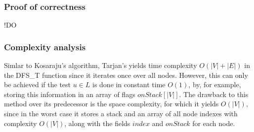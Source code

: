 \subsubsection{Proof of correctness}
!DO
\subsubsection{Complexity analysis}
Simlar to Kosaraju's algorithm, Tarjan's yields time complexity $O(|V|+|E|)$ in the DFS\_T function since it iterates once over all nodes. However, this can only be achieved if the test $u \in L$ is done in constant time $O(1)$, by, for example, storing this information in an array of flags $onStack[|V|]$.
The drawback to this method over its predecessor is the space complexity, for which it yields $O(|V|)$, since in the worst case it stores a stack and an array of all node indexes with complexity $O(|V|)$, along with the fields $index$ and $onStack$ for each node. 